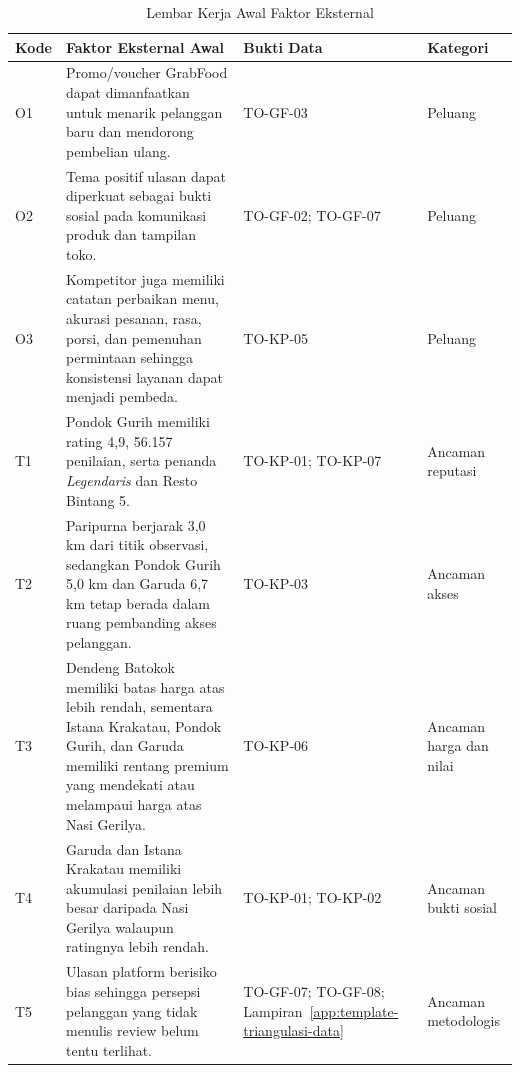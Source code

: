 \begin{table}[!htbp]
    \centering
    \caption{Lembar Kerja Awal Faktor Eksternal}
    \label{tab:lembar-kerja-faktor-eksternal}
    \scriptsize
    \setlength{\tabcolsep}{3pt}
    \renewcommand{\arraystretch}{0.92}
    \begin{tabularx}{\textwidth}{|Z{1cm}|Y|Y|Z{2cm}|}
        \toprule
        \textbf{Kode} & \textbf{Faktor Eksternal Awal} & \textbf{Bukti Data} & \textbf{Kategori} \\ \hline
        \midrule
        O1 & Promo/voucher GrabFood dapat dimanfaatkan untuk menarik pelanggan baru dan mendorong pembelian ulang. & TO-GF-03 & Peluang \\ \hline
        O2 & Tema positif ulasan dapat diperkuat sebagai bukti sosial pada komunikasi produk dan tampilan toko. & TO-GF-02; TO-GF-07 & Peluang \\ \hline
        O3 & Kompetitor juga memiliki catatan perbaikan menu, akurasi pesanan, rasa, porsi, dan pemenuhan permintaan sehingga konsistensi layanan dapat menjadi pembeda. & TO-KP-05 & Peluang \\ \hline
        T1 & Pondok Gurih memiliki rating 4,9, 56.157 penilaian, serta penanda \textit{Legendaris} dan Resto Bintang 5. & TO-KP-01; TO-KP-07 & Ancaman reputasi \\ \hline
        T2 & Paripurna berjarak 3,0 km dari titik observasi, sedangkan Pondok Gurih 5,0 km dan Garuda 6,7 km tetap berada dalam ruang pembanding akses pelanggan. & TO-KP-03 & Ancaman akses \\ \hline
        T3 & Dendeng Batokok memiliki batas harga atas lebih rendah, sementara Istana Krakatau, Pondok Gurih, dan Garuda memiliki rentang premium yang mendekati atau melampaui harga atas Nasi Gerilya. & TO-KP-06 & Ancaman harga dan nilai \\ \hline
        T4 & Garuda dan Istana Krakatau memiliki akumulasi penilaian lebih besar daripada Nasi Gerilya walaupun ratingnya lebih rendah. & TO-KP-01; TO-KP-02 & Ancaman bukti sosial \\ \hline
        T5 & Ulasan platform berisiko bias sehingga persepsi pelanggan yang tidak menulis review belum tentu terlihat. & TO-GF-07; TO-GF-08; Lampiran~\ref{app:template-triangulasi-data} & Ancaman metodologis \\ \hline
        \bottomrule
    \end{tabularx}
\end{table}

